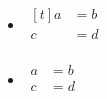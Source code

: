 \documentclass[a4paper]{article}
\begin{document}
	\begin{itemize}
		\item 
		$\begin{aligned}[t]
			a &= b \\
			c &= d \\
		\end{aligned}$
		\item 
		$\begin{aligned}
			a &= b \\
			c &= d \\
		\end{aligned}$
	\end{itemize}
\end{document}
